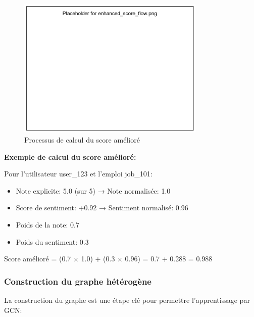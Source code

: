 \documentclass[12pt,a4paper]{article}
\begin{document}
\begin{figure}[H]
    \centering
    \includegraphics[width=0.8\textwidth]{images/enhanced_score_flow.png}
    \caption{Processus de calcul du score amélioré}
    \label{fig:enhanced_score}
\end{figure}

\begin{examplebox}
\textbf{Exemple de calcul du score amélioré:}

Pour l'utilisateur user\_123 et l'emploi job\_101:
\begin{itemize}
    \item Note explicite: 5.0 (sur 5) → Note normalisée: 1.0
    \item Score de sentiment: +0.92 → Sentiment normalisé: 0.96
    \item Poids de la note: 0.7
    \item Poids du sentiment: 0.3
\end{itemize}

Score amélioré = (0.7 × 1.0) + (0.3 × 0.96) = 0.7 + 0.288 = 0.988
\end{examplebox}

\subsubsection{Construction du graphe hétérogène}

La construction du graphe est une étape clé pour permettre l'apprentissage par GCN:
\end{document}
